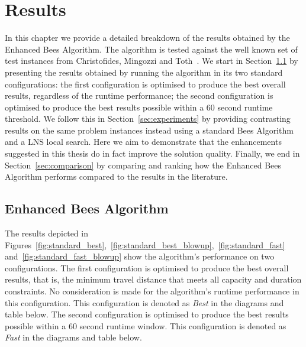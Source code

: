 
\chapter{Results}
\label{chap:results}

In this chapter we provide a detailed breakdown of the results obtained by the Enhanced Bees Algorithm. The algorithm is tested against the well known set of test instances from Christofides, Mingozzi and Toth~\cite{CMT:1981}. We start in Section~\ref{sec:standardresults} by presenting the results obtained by running the algorithm in its two standard configurations: the first configuration is optimised to produce the best overall results, regardless of the runtime performance; the second configuration is optimised to produce the best results possible within a 60 second runtime threshold. We follow this in Section~\ref{sec:experiments} by providing contrasting results on the same problem instances instead using a standard Bees Algorithm and a LNS local search. Here we aim to demonstrate that the enhancements suggested in this thesis do in fact improve the solution quality. Finally, we end in Section~\ref{sec:comparison} by comparing and ranking how the Enhanced Bees Algorithm performs compared to the results in the literature. 

\section{Enhanced Bees Algorithm}
\label{sec:standardresults}

The results depicted in Figures~\ref{fig:standard_best},~\ref{fig:standard_best_blowup},~\ref{fig:standard_fast} and~\ref{fig:standard_fast_blowup} show the algorithm's performance on two configurations. The first configuration is optimised to produce the best overall results, that is, the minimum travel distance that meets all capacity and duration constraints. No consideration is made for the algorithm's runtime performance in this configuration. This configuration is denoted as \emph{Best} in the diagrams and table below. The second configuration is optimised to produce the best results possible within a 60 second runtime window. This configuration is denoted as \emph{Fast} in the diagrams and table below.



